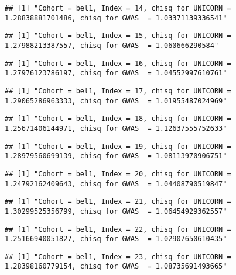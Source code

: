 \documentclass[]{article}
\begin{document}
\begin{verbatim}
## [1] "Cohort = bel1, Index = 14, chisq for UNICORN = 1.28838881701486, chisq for GWAS  = 1.03371139336541"
\end{verbatim}

\begin{verbatim}
## [1] "Cohort = bel1, Index = 15, chisq for UNICORN = 1.27988213387557, chisq for GWAS  = 1.060666290584"
\end{verbatim}

\begin{verbatim}
## [1] "Cohort = bel1, Index = 16, chisq for UNICORN = 1.27976123786197, chisq for GWAS  = 1.04552997610761"
\end{verbatim}

\begin{verbatim}
## [1] "Cohort = bel1, Index = 17, chisq for UNICORN = 1.29065286963333, chisq for GWAS  = 1.01955487024969"
\end{verbatim}

\begin{verbatim}
## [1] "Cohort = bel1, Index = 18, chisq for UNICORN = 1.25671406144971, chisq for GWAS  = 1.12637555752633"
\end{verbatim}

\begin{verbatim}
## [1] "Cohort = bel1, Index = 19, chisq for UNICORN = 1.28979560699139, chisq for GWAS  = 1.08113970906751"
\end{verbatim}

\begin{verbatim}
## [1] "Cohort = bel1, Index = 20, chisq for UNICORN = 1.24792162409643, chisq for GWAS  = 1.04408790519847"
\end{verbatim}

\begin{verbatim}
## [1] "Cohort = bel1, Index = 21, chisq for UNICORN = 1.30299525356799, chisq for GWAS  = 1.06454929362557"
\end{verbatim}

\begin{verbatim}
## [1] "Cohort = bel1, Index = 22, chisq for UNICORN = 1.25166940051827, chisq for GWAS  = 1.02907650610435"
\end{verbatim}

\begin{verbatim}
## [1] "Cohort = bel1, Index = 23, chisq for UNICORN = 1.28398160779154, chisq for GWAS  = 1.08735691493665"
\end{verbatim}
\end{document}
